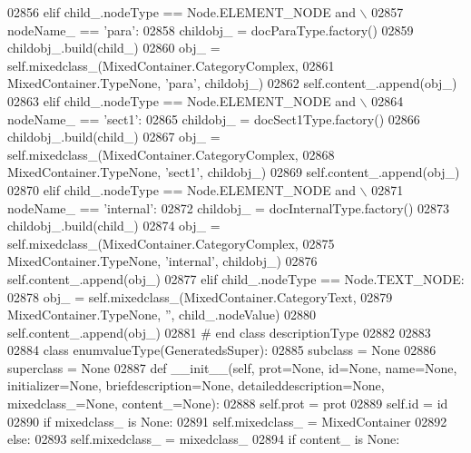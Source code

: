 \begin{DoxyCode}
{{{{{{{{{{{{{{{{{{{{{{{{{{{{{{{{{{{{{{{{{{{{{{{{{{{{{{{{{{{{{{{{{{{{{{{{{{{{{{{{{{{{{{{{{{{{{{{{{{{{{{{{{{{{{{{{{{{{{{{{{{{{{{{{{{{{{{{{{{{{{{{{{{{{{{{{{{{{{{{{{{{{{{{{{{{{{{{{{{{{{{{{{{{{{{{{{{{{{02856         \textcolor{keywordflow}{elif} child\_.nodeType == Node.ELEMENT\_NODE \textcolor{keywordflow}{and} \(\backslash\)
02857             nodeName\_ == \textcolor{stringliteral}{'para'}:
02858             childobj\_ = docParaType.factory()
02859             childobj\_.build(child\_)
02860             obj\_ = self.mixedclass\_(MixedContainer.CategoryComplex,
02861                 MixedContainer.TypeNone, \textcolor{stringliteral}{'para'}, childobj\_)
02862             self.content\_.append(obj\_)
02863         \textcolor{keywordflow}{elif} child\_.nodeType == Node.ELEMENT\_NODE \textcolor{keywordflow}{and} \(\backslash\)
02864             nodeName\_ == \textcolor{stringliteral}{'sect1'}:
02865             childobj\_ = docSect1Type.factory()
02866             childobj\_.build(child\_)
02867             obj\_ = self.mixedclass\_(MixedContainer.CategoryComplex,
02868                 MixedContainer.TypeNone, \textcolor{stringliteral}{'sect1'}, childobj\_)
02869             self.content\_.append(obj\_)
02870         \textcolor{keywordflow}{elif} child\_.nodeType == Node.ELEMENT\_NODE \textcolor{keywordflow}{and} \(\backslash\)
02871             nodeName\_ == \textcolor{stringliteral}{'internal'}:
02872             childobj\_ = docInternalType.factory()
02873             childobj\_.build(child\_)
02874             obj\_ = self.mixedclass\_(MixedContainer.CategoryComplex,
02875                 MixedContainer.TypeNone, \textcolor{stringliteral}{'internal'}, childobj\_)
02876             self.content\_.append(obj\_)
02877         \textcolor{keywordflow}{elif} child\_.nodeType == Node.TEXT\_NODE:
02878             obj\_ = self.mixedclass\_(MixedContainer.CategoryText,
02879                 MixedContainer.TypeNone, \textcolor{stringliteral}{''}, child\_.nodeValue)
02880             self.content\_.append(obj\_)
02881 \textcolor{comment}{# end class descriptionType}
02882 
02883 
02884 \textcolor{keyword}{class }enumvalueType(GeneratedsSuper):
02885     subclass = \textcolor{keywordtype}{None}
02886     superclass = \textcolor{keywordtype}{None}
02887     \textcolor{keyword}{def }__init__(self, prot=None, id=None, name=None, initializer=None, briefdescription=None, 
      detaileddescription=None, mixedclass\_=None, content\_=None):
02888         self.prot = prot
02889         self.id = id
02890         \textcolor{keywordflow}{if} mixedclass\_ \textcolor{keywordflow}{is} \textcolor{keywordtype}{None}:
02891             self.mixedclass_ = MixedContainer
02892         \textcolor{keywordflow}{else}:
02893             self.mixedclass_ = mixedclass\_
02894         \textcolor{keywordflow}{if} content\_ \textcolor{keywordflow}{is} \textcolor{keywordtype}{None}:
}}}}}}}}}}}}}}}}}}}}}}}}}}}}}}}}}}}}}}}}}}}}}}}}}}}}}}}}}}}}}}}}}}}}}}}}}}}}}}}}}}}}}}}}}}}}}}}}}}}}}}}}}}}}}}}}}}}}}}}}}}}}}}}}}}}}}}}}}}}}}}}}}}}}}}}}}}}}}}}}}}}}}}}}}}}}}}}}}}}}}}}}}}}}}}}}}}}}}
\end{DoxyCode}
